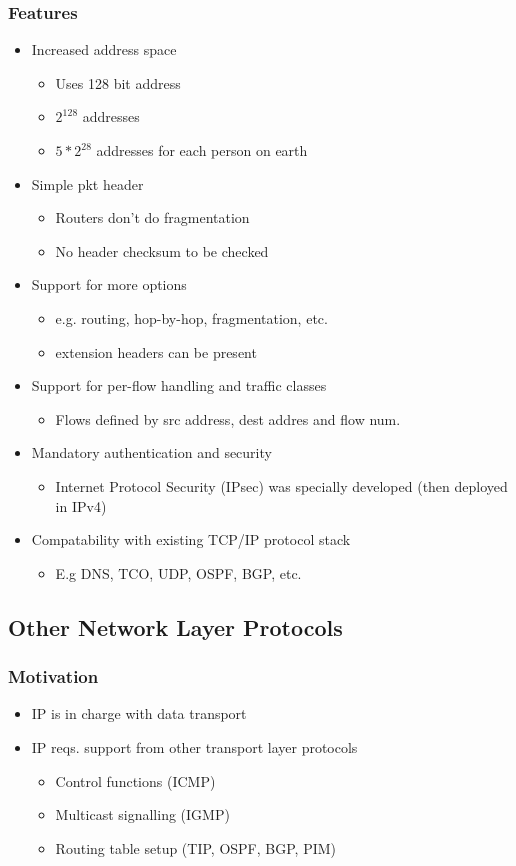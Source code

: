 \documentclass[a4paper]{article}
\begin{document}
\subsubsection{Features}
\begin{itemize}
	\item Increased address space
	\begin{itemize}
		\item Uses 128 bit address
		\item $2^{128}$ addresses
		\item $5*2^{28}$ addresses for each person on earth
	\end{itemize}
	\item Simple pkt header
	\begin{itemize}
		\item Routers don't do fragmentation
		\item No header checksum to be checked
	\end{itemize}
	\item Support for more options
	\begin{itemize}
		\item e.g. routing, hop-by-hop, fragmentation, etc.
		\item extension headers can be present
	\end{itemize}
	\item Support for per-flow handling and traffic classes
	\begin{itemize}
		\item Flows defined by src address, dest addres and flow num.
	\end{itemize}
	\item Mandatory authentication and security
	\begin{itemize}
		\item Internet Protocol Security (IPsec) was specially developed
			(then deployed in IPv4)
	\end{itemize}
	\item Compatability with existing TCP/IP protocol stack
	\begin{itemize}
		\item E.g DNS, TCO, UDP, OSPF, BGP, etc.
	\end{itemize}
\end{itemize}
\subsection{Other Network Layer Protocols}
\subsubsection{Motivation}
\begin{itemize}
	\item IP is in charge with data transport
	\item IP reqs. support from other transport layer protocols
	\begin{itemize}
		\item Control functions (ICMP)
		\item Multicast signalling (IGMP)
		\item Routing table setup (TIP, OSPF, BGP, PIM)
	\end{itemize}
\end{itemize}
\end{document}
